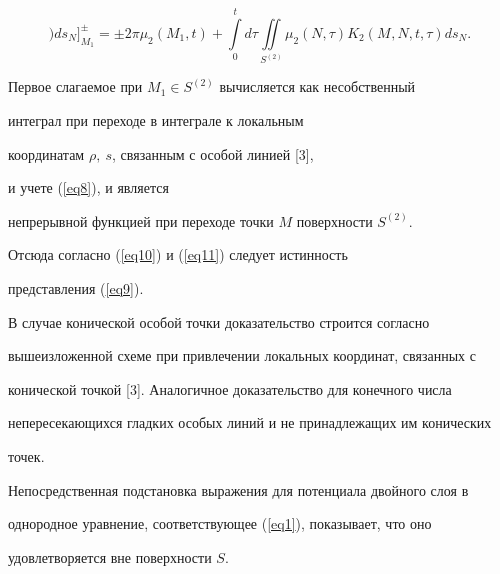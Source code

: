\begin{pf}
\begin{equation}
{)ds_{N}}\bigg]_{M_{1}} ^{\pm}=\pm 2\pi \mu_{2} ({M_{1} ,t})+ 


%


\int\limits_{0}^{t} {} d\tau \iint\limits_{S^{({2} 


)}} {} \mu_{2} ({N,\tau})K_{2} ({M_{} ,N,t,\tau} )ds_{N}. 


\end{equation}





Первое слагаемое при $M_1\in S^{(2)}$ вычисляется как несобственный 


интеграл при переходе в интеграле к локальным 


координатам $\rho,\ s$, связанным с особой линией [3],


и учете (\ref{eq8}), и является 


непрерывной функцией при переходе точки $M$ поверхности $S^{({2})}$.


Отсюда согласно (\ref{eq10}) и (\ref{eq11}) следует истинность 


представления (\ref{eq9}).





В случае конической особой точки доказательство строится согласно 


вышеизложенной схеме при привлечении локальных координат, связанных с 


конической точкой [3]. Аналогичное доказательство для конечного числа 


непересекающихся гладких особых линий и не принадлежащих им конических 


точек.





Непосредственная подстановка выражения для потенциала двойного слоя в 


однородное уравнение, соответствующее (\ref{eq1}), показывает, что оно 


удовлетворяется вне поверхности $S$.


\end{pf}








